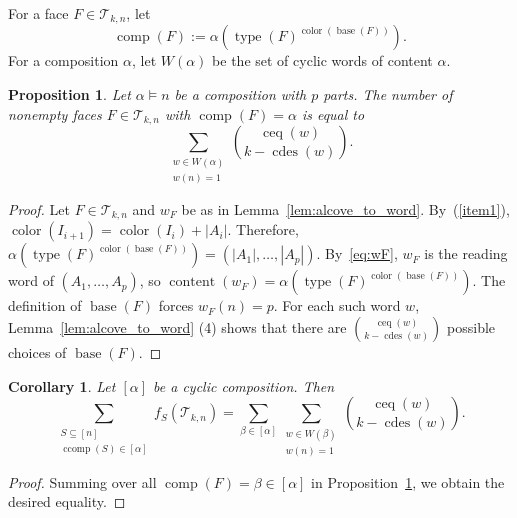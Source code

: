 \documentclass[10pt,a4paper]{amsart}
\theoremstyle{plain}
\newtheorem{proposition}[theorem]{Proposition}
\newtheorem{corollary}[theorem]{Corollary}
\theoremstyle{definition}
\newcommand{\Tri}{\mathcal{T}_{k,n}}
\DeclareMathOperator{\typ}{type}
\DeclareMathOperator{\comp}{comp}
\DeclareMathOperator{\ccomp}{ccomp}
\DeclareMathOperator{\base}{base}
\DeclareMathOperator{\col}{color}
\DeclareMathOperator{\cdes}{cdes}
\DeclareMathOperator{\ceq}{ceq}
\DeclareMathOperator{\content}{content}
\begin{document}
For a face $ F \in \Tri $, let
\begin{equation}
	\comp(F):= \alpha(\typ(F)^{\col(\base(F))}).
\end{equation}
For a composition $\alpha$, let $W(\alpha)$ be the set of cyclic words of content $\alpha$.

\begin{proposition}\label{prop:compF}
	Let $ \alpha \models n $
	be a composition with $ p $ parts. The number of nonempty faces $ F \in \Tri $ with $ \comp(F) = \alpha $ is equal to
	\begin{equation}\label{eq:Nalpha}
		\sum_{\substack{w \in W(\alpha) \\ w(n) = 1}} \binom{\ceq(w)}{k - \cdes(w)}.
	\end{equation}
\end{proposition}

\begin{proof}
	Let $ F \in \Tri $ and $ w_F $
	be as in Lemma~\ref{lem:alcove_to_word}. By~(\ref{item1}), $
		\col(I_{i+1}) = \col(I_i) + |A_i| $. Therefore, $
		\alpha(\typ(F)^{\col(\base(F))}) = (|A_1|,\dots,|A_p|) $. By~\eqref{eq:wF}, $ w_F $
	is the reading word of $ (A_1,\dots,A_p) $, so $
		\content(w_F) = \alpha(\typ(F)^{\col(\base(F))}) $. The definition of $ \base(F) $ forces $ w_F(n) = p $. For each such word $w$, Lemma~\ref{lem:alcove_to_word} (4) shows that there are $\binom{\ceq(w)}{k - \cdes(w)}$ possible choices of $\base(F)$.
\end{proof}

\begin{corollary}
	Let $ [\alpha] $ be a cyclic composition. Then
	\begin{equation}
		\sum_{\substack{S \subseteq [n] \\ \ccomp(S) \in [\alpha]}} f_S(\Tri) = \sum_{\beta \in [\alpha]} \sum_{\substack{w \in W(\beta) \\ w(n) = 1}} \binom{\ceq(w)}{k - \cdes(w)}.
	\end{equation}
\end{corollary}
\begin{proof}
	Summing over all $\comp(F) = \beta \in [\alpha]$ in Proposition~\ref{prop:compF}, we obtain the desired equality.
\end{proof}
\end{document}

